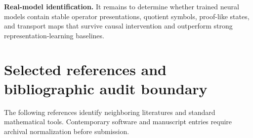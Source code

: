 \documentclass[11pt]{article}
\theoremstyle{definition}
\theoremstyle{remark}
\begin{document}
\begin{placeholderbox}
\textbf{Real-model identification.} It remains to determine whether trained neural models contain stable operator presentations, quotient symbols, proof-like states, and transport maps that survive causal intervention and outperform strong representation-learning baselines.
\end{placeholderbox}

\section{Selected references and bibliographic audit boundary}

The following references identify neighboring literatures and standard mathematical tools. Contemporary software and manuscript entries require archival normalization before submission.
\end{document}
